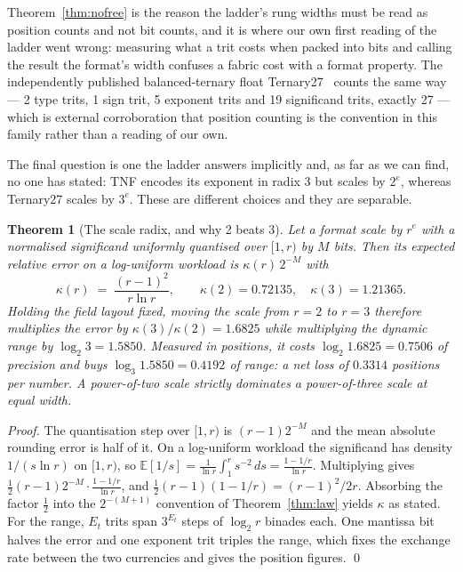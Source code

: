 \documentclass[11pt]{article}
\newtheorem{theorem}{Theorem}
\theoremstyle{definition}
\begin{document}
Theorem~\ref{thm:nofree} is the reason the ladder's rung widths must be read as
position counts and not bit counts, and it is where our own first reading of the
ladder went wrong: measuring what a trit costs when packed into bits and calling
the result the format's width confuses a fabric cost with a format property. The
independently published balanced-ternary float Ternary27~\cite{ternary27} counts
the same way --- 2 type trits, 1 sign trit, 5 exponent trits and 19 significand
trits, exactly 27 --- which is external corroboration that position counting is
the convention in this family rather than a reading of our own.


The final question is one the ladder answers implicitly and, as far as we can
find, no one has stated: TNF encodes its exponent in radix 3 but scales by
$2^{e}$, whereas Ternary27 scales by $3^{e}$. These are different choices and
they are separable.

\begin{theorem}[The scale radix, and why 2 beats 3]
\label{thm:scaleradix}
Let a format scale by $r^{e}$ with a normalised significand uniformly quantised
over $[1, r)$ by $M$ bits. Then its expected relative error on a log-uniform
workload is $\kappa(r)\,2^{-M}$ with
\[
\kappa(r) \;=\; \frac{(r-1)^{2}}{r\ln r},
\qquad \kappa(2) = 0.72135,\quad \kappa(3) = 1.21365 .
\]
Holding the field layout fixed, moving the scale from $r=2$ to $r=3$ therefore
multiplies the error by $\kappa(3)/\kappa(2) = 1.6825$ while multiplying the
dynamic range by $\log_2 3 = 1.5850$. Measured in positions, it costs
$\log_2 1.6825 = 0.7506$ of precision and buys $\log_3 1.5850 = 0.4192$ of range:
a net loss of $0.3314$ positions per number. A power-of-two scale strictly
dominates a power-of-three scale at equal width.
\end{theorem}

\begin{proof}
The quantisation step over $[1,r)$ is $(r-1)2^{-M}$ and the mean absolute
rounding error is half of it. On a log-uniform workload the significand has
density $1/(s\ln r)$ on $[1,r)$, so
$\mathbb{E}[1/s] = \frac{1}{\ln r}\int_1^{r} s^{-2}\,ds = \frac{1-1/r}{\ln r}$.
Multiplying gives $\tfrac12 (r-1)2^{-M}\cdot\frac{1-1/r}{\ln r}$, and
$\tfrac12(r-1)(1-1/r) = (r-1)^2/2r$. Absorbing the factor $\tfrac12$ into the
$2^{-(M+1)}$ convention of Theorem~\ref{thm:law} yields $\kappa$ as stated. For
the range, $E_t$ trits span $3^{E_t}$ steps of $\log_2 r$ binades each. One
mantissa bit halves the error and one exponent trit triples the range, which
fixes the exchange rate between the two currencies and gives the position
figures. \qed
\end{proof}
\end{document}
